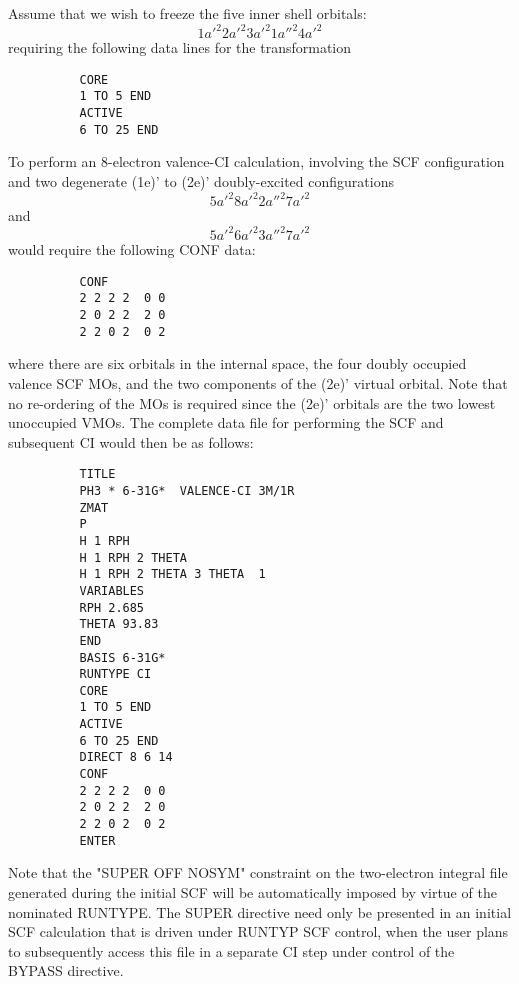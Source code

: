 \documentclass[11pt,fleqn]{article}
\begin{document}
Assume that we wish to freeze the five inner shell orbitals:
\begin{equation}
  1a'^{2}  2a'^{2}  3a'^{2}  1a''^{2}  4a'^{2}  
\end{equation}
requiring the following data lines for the transformation
{
\footnotesize
\begin{verbatim}
          CORE
          1 TO 5 END
          ACTIVE
          6 TO 25 END
\end{verbatim}
}
To perform an 8-electron valence-CI calculation,
involving the SCF configuration and  two  degenerate (1e)' to (2e)'
doubly-excited  configurations 
\begin{equation}
    5a'^{2}  8a'^{2} 2a''^{2} 7a'^{2}
\end{equation}
and
\begin{equation}
    5a'^{2}  6a'^{2} 3a''^{2} 7a'^{2}
\end{equation}
would require the following CONF data:
{
\footnotesize
\begin{verbatim}
          CONF
          2 2 2 2  0 0
          2 0 2 2  2 0
          2 2 0 2  0 2
\end{verbatim}
}
where there are six orbitals in the internal space, the four doubly
occupied valence SCF MOs, and the two components of the (2e)' virtual
orbital. Note that no re-ordering of the MOs is required since the (2e)'
orbitals are the two lowest unoccupied VMOs.  The complete data file
for performing the SCF and subsequent CI would then be as follows:

{
\footnotesize
\begin{verbatim}
          TITLE
          PH3 * 6-31G*  VALENCE-CI 3M/1R
          ZMAT 
          P
          H 1 RPH
          H 1 RPH 2 THETA
          H 1 RPH 2 THETA 3 THETA  1
          VARIABLES
          RPH 2.685   
          THETA 93.83  
          END
          BASIS 6-31G*
          RUNTYPE CI
          CORE
          1 TO 5 END
          ACTIVE
          6 TO 25 END
          DIRECT 8 6 14
          CONF
          2 2 2 2  0 0
          2 0 2 2  2 0
          2 2 0 2  0 2
          ENTER
\end{verbatim}
}
Note that the "SUPER OFF NOSYM" constraint on the two-electron
integral file generated during the initial SCF will be automatically
imposed by virtue of the nominated RUNTYPE. The SUPER directive need
only be presented in an initial SCF calculation that is driven under
RUNTYP SCF control, when the user plans to subsequently access this
file in a separate CI step under control of the BYPASS directive.
\end{document}
